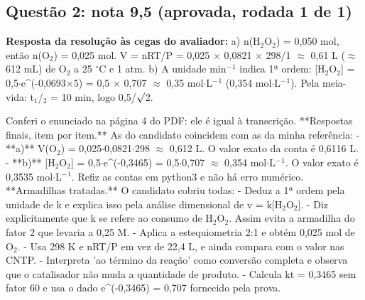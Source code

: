 \documentclass{article}%
\begin{document}
\subsection*{Questão 2: nota 9,5 (aprovada, rodada 1 de 1)}%
\textbf{Resposta da resolução às cegas do avaliador:} a) n(H$_{2}$O$_{2}$) = 0,050 mol, então n(O$_{2}$) = 0,025 mol. V = nRT/P = 0,025 $\times$ 0,0821 $\times$ 298/1 $\approx$ 0,61 L ($\approx$ 612 mL) de O$_{2}$ a 25 $^\circ$C e 1 atm.\newline%
b) A unidade min$^{-}$$^{1}$ indica 1ª ordem: {[}H$_{2}$O$_{2}${]} = 0,5$\cdot$e\^{}(-0,0693$\times$5) = 0,5 $\times$ 0,707 $\approx$ 0,35 mol$\cdot$L$^{-}$$^{1}$ (0,354 mol$\cdot$L$^{-}$$^{1}$). Pela meia{-}vida: t$_{1}$/$_{2}$ = 10 min, logo 0,5/$\surd$2.\par %
Conferi o enunciado na página 4 do PDF: ele é igual à transcrição.\newline%
\newline%
**Respostas finais, item por item.** As do candidato coincidem com as da minha referência:\newline%
{-} **a)** V(O$_{2}$) = 0,025$\cdot$0,0821$\cdot$298 $\approx$ 0,612 L. O valor exato da conta é 0,6116 L.\newline%
{-} **b)** {[}H$_{2}$O$_{2}${]} = 0,5$\cdot$e\^{}(-0,3465) = 0,5$\cdot$0,707 $\approx$ 0,354 mol$\cdot$L$^{-}$$^{1}$. O valor exato é 0,3535 mol$\cdot$L$^{-}$$^{1}$.\newline%
\newline%
Refiz as contas em python3 e não há erro numérico.\newline%
\newline%
**Armadilhas tratadas.** O candidato cobriu todas:\newline%
{-} Deduz a 1ª ordem pela unidade de k e explica isso pela análise dimensional de v = k{[}H$_{2}$O$_{2}${]}.\newline%
{-} Diz explicitamente que k se refere ao consumo de H$_{2}$O$_{2}$. Assim evita a armadilha do fator 2 que levaria a 0,25 M.\newline%
{-} Aplica a estequiometria 2:1 e obtém 0,025 mol de O$_{2}$.\newline%
{-} Usa 298 K e nRT/P em vez de 22,4 L, e ainda compara com o valor nas CNTP.\newline%
{-} Interpreta 'ao término da reação' como conversão completa e observa que o catalisador não muda a quantidade de produto.\newline%
{-} Calcula kt = 0,3465 sem fator 60 e usa o dado e\^{}(-0,3465) = 0,707 fornecido pela prova.\newline%
$$
\end{document}
